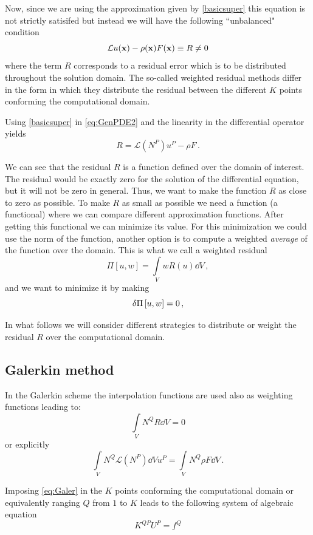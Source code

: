 Now, since we are using the approximation given by \cref{basicsuper} this equation is not strictly satisifed but instead we will have the following ``unbalanced" condition
\[\mathcal{L}u(\vb{x}) - \rho (\vb{x})F(\vb{x}) \equiv R \ne 0\]
where the term $R$ corresponds to a residual error which is to be distributed throughout the solution domain. The so-called weighted residual methods differ in the form in which they distribute the residual between the different $K$ points conforming the computational domain.

Using \cref{basicsuper} in \cref{eq:GenPDE2} and the linearity in the differential operator yields
\[R = \mathcal{L}({N^P}){u^P} - \rho F\, .\]

We can see that the residual $R$ is a function defined over the domain of interest. The residual would be exactly zero for the solution of the differential equation, but it will not be zero in general. Thus, we want to make the function $R$ as close to zero as possible. To make $R$ as small as possible we need a function (a functional) where we can compare different approximation functions. After getting this functional we can minimize its value. For this minimization we could use the norm of the function, another option is to compute a weighted \emph{average} of the function over the domain. This is what we call a weighted residual
\[\Pi[u, w] = \int\limits_V w R(u) \dd{V}\, ,\]
and we want to minimize it by making
\[\var{\Pi}[u, w] = 0\, ,\]

In what follows we will consider different strategies to distribute or weight the residual $R$ over the computational domain.

\subsection{Galerkin method}
In the Galerkin scheme the interpolation functions are used also as weighting functions leading to:
\[\int\limits_V N^Q R\dd{V} = 0 \]
or explicitly
\begin{equation}
  \int\limits_V N^Q \mathcal{L} (N^P)\dd{V} u^P = \int\limits_V N^Q\rho F\dd{V}\, .
  \label{eq:Galer}
\end{equation}

Imposing \cref{eq:Galer} in the $K$ points conforming the computational domain or equivalently ranging $Q$ from $1$ to $K$ leads to the following system of algebraic equation
\begin{equation}
{K^{QP}}{U^P} = {f^Q}
\label{eq:DGaler}
\end{equation}

